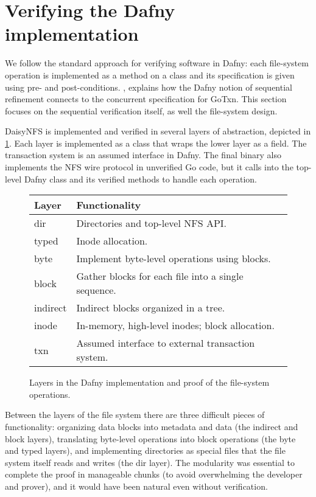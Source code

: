 \section{Verifying the Dafny implementation}%
\label{sec:daisy:design}

We follow the standard approach for verifying software in Dafny: each
file-system operation is implemented as a method on a class and its
specification is given using pre- and post-conditions. ,
explains how the Dafny notion of sequential refinement connects to the
concurrent specification for GoTxn. This section focuses on the sequential
verification itself, as well the file-system design.


DaisyNFS is implemented and verified in several layers of abstraction, depicted
in \cref{fig:dafny-layers}. Each layer is implemented as a class that wraps the
lower layer as a field. The transaction system is an assumed interface in Dafny.
The final  binary also implements the NFS wire protocol in
unverified Go code, but it calls into the top-level Dafny class and its verified
methods to handle each operation.

\begin{figure}
\small \centering
\begin{tabular}{ll}
  \toprule
  \textbf{Layer} & \textbf{Functionality} \\
  \midrule
  dir & Directories and top-level NFS API. \\
  typed & Inode allocation. \\
  byte & Implement byte-level operations using blocks. \\
  block & Gather blocks for each file into a single sequence. \\
  indirect & Indirect blocks organized in a tree. \\
  inode & In-memory, high-level inodes; block allocation. \\
  txn & Assumed interface to external transaction system. \\
  \bottomrule
\end{tabular}
\caption{Layers in the Dafny implementation and proof of the file-system
operations.}
\label{fig:dafny-layers}
\end{figure}

Between the layers of the file system
there are three difficult pieces of
functionality: organizing data blocks into metadata and data (the
indirect and block layers), translating byte-level operations into
block operations (the byte and typed layers), and implementing
directories as special files that the file system itself reads and
writes (the dir layer). The modularity was essential to complete the proof in
manageable chunks (to avoid overwhelming the developer and prover), and it would
have been natural even without verification.

